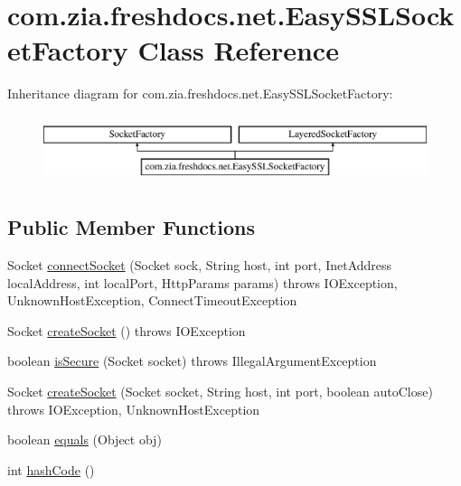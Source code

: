 \hypertarget{classcom_1_1zia_1_1freshdocs_1_1net_1_1_easy_s_s_l_socket_factory}{\section{com.\-zia.\-freshdocs.\-net.\-Easy\-S\-S\-L\-Socket\-Factory Class Reference}
\label{classcom_1_1zia_1_1freshdocs_1_1net_1_1_easy_s_s_l_socket_factory}
}
Inheritance diagram for com.\-zia.\-freshdocs.\-net.\-Easy\-S\-S\-L\-Socket\-Factory\-:\begin{figure}[H]
\begin{center}
\leavevmode
\includegraphics[height=1.992882cm]{classcom_1_1zia_1_1freshdocs_1_1net_1_1_easy_s_s_l_socket_factory}
\end{center}
\end{figure}
\subsection*{Public Member Functions}
\begin{DoxyCompactItemize}
\item 
Socket \hyperlink{classcom_1_1zia_1_1freshdocs_1_1net_1_1_easy_s_s_l_socket_factory_a622010bbd18ec5f414424cae1d930889}{connect\-Socket} (Socket sock, String host, int port, Inet\-Address local\-Address, int local\-Port, Http\-Params params)  throws I\-O\-Exception, Unknown\-Host\-Exception, Connect\-Timeout\-Exception 	
\item 
Socket \hyperlink{classcom_1_1zia_1_1freshdocs_1_1net_1_1_easy_s_s_l_socket_factory_ad0c628bfd6a620a2f02426daa52c6521}{create\-Socket} ()  throws I\-O\-Exception 	
\item 
boolean \hyperlink{classcom_1_1zia_1_1freshdocs_1_1net_1_1_easy_s_s_l_socket_factory_a053b19f563e8dc9bf3778508fd125038}{is\-Secure} (Socket socket)  throws Illegal\-Argument\-Exception 	
\item 
Socket \hyperlink{classcom_1_1zia_1_1freshdocs_1_1net_1_1_easy_s_s_l_socket_factory_ad519bcc7034810c476422fac8cda3d44}{create\-Socket} (Socket socket, String host, int port, boolean auto\-Close)  throws I\-O\-Exception, Unknown\-Host\-Exception 	
\item 
boolean \hyperlink{classcom_1_1zia_1_1freshdocs_1_1net_1_1_easy_s_s_l_socket_factory_a174b8691ca7a8a5c04d3f9400ff7c325}{equals} (Object obj)
\item 
int \hyperlink{classcom_1_1zia_1_1freshdocs_1_1net_1_1_easy_s_s_l_socket_factory_a096c4d620f89cdcbc50b16093d72fa38}{hash\-Code} ()
\end{DoxyCompactItemize}


